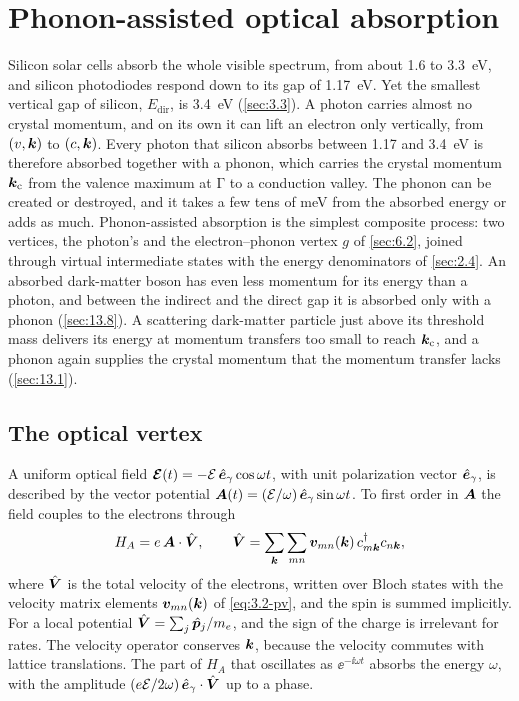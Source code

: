 \section{Phonon-assisted optical absorption}\label{sec:6.5}

Silicon solar cells absorb the whole visible spectrum, from about 1.6 to \SI{3.3}{eV}, and silicon photodiodes respond down to its gap of \SI{1.17}{eV}. Yet the smallest vertical gap of silicon, $E_{\mathrm{dir}}$, is \SI{3.4}{eV} (\cref{sec:3.3}). A photon carries almost no crystal momentum, and on its own it can lift an electron only vertically, from $(v,\bm{k})$ to $(c,\bm{k})$. Every photon that silicon absorbs between \SI{1.17}{} and \SI{3.4}{eV} is therefore absorbed together with a phonon, which carries the crystal momentum $\bm{k}_{\mathrm{c}}$ from the valence maximum at $\mathrm{\Gamma}$ to a conduction valley. The phonon can be created or destroyed, and it takes a few tens of meV from the absorbed energy or adds as much. Phonon-assisted absorption is the simplest composite process: two vertices, the photon's and the electron--phonon vertex $g$ of \cref{sec:6.2}, joined through virtual intermediate states with the energy denominators of \cref{sec:2.4}. An absorbed dark-matter boson has even less momentum for its energy than a photon, and between the indirect and the direct gap it is absorbed only with a phonon (\cref{sec:13.8}). A scattering dark-matter particle just above its threshold mass delivers its energy at momentum transfers too small to reach $\bm{k}_{\mathrm{c}}$, and a phonon again supplies the crystal momentum that the momentum transfer lacks (\cref{sec:13.1}).

\subsection{The optical vertex}

A uniform optical field $\bm{\mathcal{E}}(t) = -\mathcal{E}\,\hat{\bm{e}}_\gamma\cos\omega t$, with unit polarization vector $\hat{\bm{e}}_\gamma$, is described by the vector potential $\bm{A}(t) = (\mathcal{E}/\omega)\,\hat{\bm{e}}_\gamma\sin\omega t$. To first order in $\bm{A}$ the field couples to the electrons through
\begin{equation}
  H_A = e\,\bm{A}\cdot\hat{\bm{V}}, \qquad
  \hat{\bm{V}} = \sum_{\bm{k}}\sum_{mn}\bm{v}_{mn}(\bm{k})\,c^\dagger_{m\bm{k}}c_{n\bm{k}} ,
  \label{eq:6.5-HA}
\end{equation}
where $\hat{\bm{V}}$ is the total velocity of the electrons, written over Bloch states with the velocity matrix elements $\bm{v}_{mn}(\bm{k})$ of \cref{eq:3.2-pv}, and the spin is summed implicitly. For a local potential $\hat{\bm{V}} = \sum_j\hat{\bm{p}}_j/m_e$, and the sign of the charge is irrelevant for rates. The velocity operator conserves $\bm{k}$, because the velocity commutes with lattice translations. The part of $H_A$ that oscillates as $\ee^{-\ii\omega t}$ absorbs the energy $\omega$, with the amplitude $(e\mathcal{E}/2\omega)\,\hat{\bm{e}}_\gamma\cdot\hat{\bm{V}}$ up to a phase.

